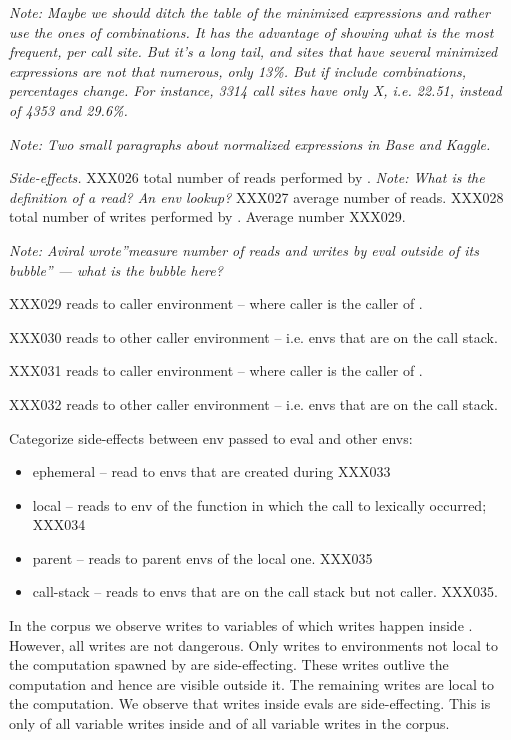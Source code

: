 \documentclass[acmsmall]{acmart}
\newcommand{\mypara}[1]{\medskip\noindent\emph{#1}\xspace}
\newcommand{\NOTE}[1]{{\it Note: #1}\xspace}
\begin{document}
\NOTE{Maybe we should ditch the table of the minimized expressions and rather use the ones of combinations. It has the advantage of showing what is the most frequent, per call site. But it's a long tail, and sites that have several minimized expressions are not that numerous, only 13\%. But if include combinations, percentages change. For instance, 3314 call sites have only X, i.e. 22.51, instead of 4353 and 29.6\%. }


\NOTE{Two small paragraphs about normalized expressions in Base and Kaggle.}


\mypara{Side-effects.} XXX026 total number of reads performed by
\eval. \NOTE{What is the definition of a read? An env lookup?} XXX027
average number of reads. XXX028 total number of writes performed by
\eval. Average number XXX029.

\NOTE{Aviral wrote''measure number of reads and writes by eval outside
  of its bubble'' --- what is the bubble here?}

XXX029 reads to caller environment -- where caller is the caller of
\eval.

XXX030 reads to other caller environment -- i.e. envs that are on the
call stack.

XXX031 reads to caller environment -- where caller is the caller of
\eval.

XXX032 reads to other caller environment -- i.e. envs that are on the
call stack.

Categorize side-effects between env passed to eval and other envs:
\begin{itemize}
\item ephemeral -- read to envs that are created during \eval  XXX033
\item local -- reads to env of the function in which the call to \eval
  lexically occurred; XXX034
\item parent -- reads to parent envs of the local one. XXX035
\item call-stack -- reads to envs that are on the call stack but not
  caller. XXX035.
\end{itemize}

In the corpus we observe \AllWritesRnd writes to variables of which
\EvalWritesRnd writes happen inside \eval. However, all writes are not
dangerous. Only writes to environments not local to the computation
spawned by \eval are side-effecting. These writes outlive the
computation and hence are visible outside it. The remaining writes are
local to the computation. We observe that \EvalSideEffectingWritesRnd
writes inside evals are side-effecting. This is only
\EvalSideEffectingWritesEvalPerc of all variable writes inside \eval
and \EvalSideEffectingWritesAllPerc of all variable writes in the
corpus.
\end{document}
